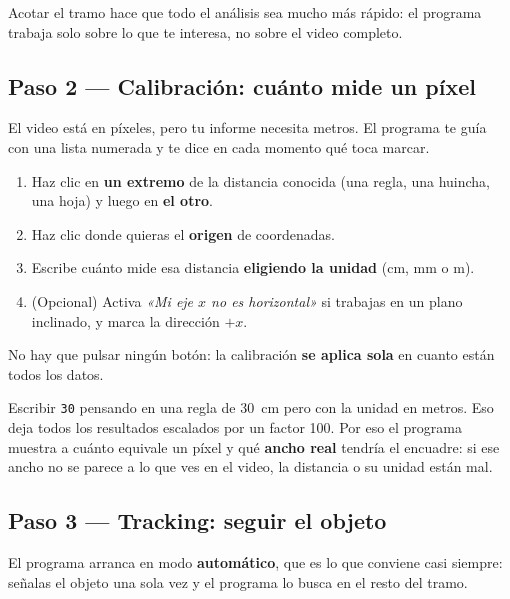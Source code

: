 \documentclass[11pt,a4paper]{article}
\begin{document}
\begin{idea}
  Acotar el tramo hace que todo el análisis sea mucho más rápido: el programa
  trabaja solo sobre lo que te interesa, no sobre el video completo.
\end{idea}

\subsection{Paso 2 — Calibración: cuánto mide un píxel}

El video está en píxeles, pero tu informe necesita metros. El programa te guía
con una lista numerada y te dice en cada momento qué toca marcar.

\begin{receta}[Calibrar]
  \begin{enumerate}
    \item Haz clic en \textbf{un extremo} de la distancia conocida (una regla,
      una huincha, una hoja) y luego en \textbf{el otro}.
    \item Haz clic donde quieras el \textbf{origen} de coordenadas.
    \item Escribe cuánto mide esa distancia \textbf{eligiendo la unidad}
      (\si{\centi\meter}, \si{\milli\meter} o \si{\meter}).
    \item (Opcional) Activa \emph{«Mi eje $x$ no es horizontal»} si trabajas en un
      plano inclinado, y marca la dirección $+x$.
  \end{enumerate}
  No hay que pulsar ningún botón: la calibración \textbf{se aplica sola} en
  cuanto están todos los datos.
\end{receta}

\begin{errcomun}
  Escribir \texttt{30} pensando en una regla de \SI{30}{\centi\meter} pero con la
  unidad en metros. Eso deja todos los resultados escalados por un factor 100.
  Por eso el programa muestra a cuánto equivale un píxel y qué \textbf{ancho real}
  tendría el encuadre: si ese ancho no se parece a lo que ves en el video, la
  distancia o su unidad están mal.
\end{errcomun}

\subsection{Paso 3 — Tracking: seguir el objeto}

El programa arranca en modo \textbf{automático}, que es lo que conviene casi
siempre: señalas el objeto una sola vez y el programa lo busca en el resto del
tramo.
\end{document}
